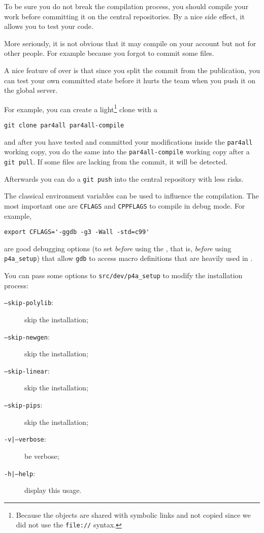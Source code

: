 \documentclass[a4paper]{article}
\begin{document}
To be sure you do not break the compilation process, you should compile
your work before committing it on the central repositories. By a nice side
effect, it allows you to test your code. \smiley

More seriously, it is not obvious that it may compile on your account but
not for other people. For example because you forgot to commit some files.

A nice feature of \Agit over \Asvn is that since you split the commit from
the publication, you can test your own committed state before it hurts the
team when you push it on the global server.

For example, you can create a light\footnote{Because the objects are
  shared with symbolic links and not copied since we did not use the
  \texttt{file://} syntax.} clone with a
\begin{verbatim}
git clone par4all par4all-compile
\end{verbatim}
and after you have tested and committed your modifications inside the
\texttt{par4all} working copy, you do the same into the
\texttt{par4all-compile} working copy after a \texttt{git pull}.
If some files are lacking from the commit, it will be detected.

Afterwards you can do a \texttt{git push} into the central \Apfa
repository with less risks.

The classical \Aautotools environment variables can be used to influence
the compilation. The most important one are \texttt{CFLAGS} and
\texttt{CPPFLAGS} to compile \Apfa in debug mode. For example,
\begin{verbatim}
export CFLAGS='-ggdb -g3 -Wall -std=c99'
\end{verbatim}
are good debugging options (to set \emph{before} using the \Aautotools,
that is, \emph{before} using \verb|p4a_setup|) that allow \texttt{gdb} to
access macro definitions that are heavily used in \Apips.

You can pass some options to \verb|src/dev/p4a_setup| to modify the
installation process:
\begin{description}
\item[\texttt{--skip-polylib}:] skip the \Apolylib installation;
\item[\texttt{--skip-newgen}:] skip the \Anewgen installation;
\item[\texttt{--skip-linear}:] skip the \Alinear installation;
\item[\texttt{--skip-pips}:] skip the \Apips installation;
\item[\texttt{-v|--verbose}:] be verbose;
\item[\texttt{-h|--help}:] display this usage.
\end{description}
\end{document}
